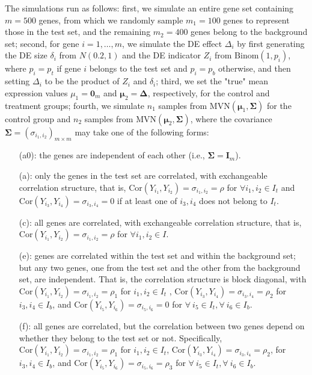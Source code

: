 \documentclass[11pt, a4paper]{article}
\begin{document}
		The simulations run as follows: first, we simulate an entire gene set containing $m=500$ genes, from which we randomly sample $m_1 = 100$ genes to represent those in the test set, and the remaining $m_2=400$ genes belong to the background set; second, for gene $i=1, \ldots, m$, we simulate the DE effect $\Delta_i$ by first generating the DE size $\delta_i$ from $N(0.2, 1)$ and the DE indicator $Z_i$ from $\text{Binom}(1, p_i)$,  where $p_i= p_t$ if gene $i$ belongs to the test set and $p_i = p_b$  otherwise, and then setting $\Delta_i$ to be the product of $Z_i$ and $\delta_i$; third, we set the "true" mean expression values $\mu_1 = \bm 0_m$ and $\bm \mu_2 = \bm \Delta$, respectively,  for the control and treatment groups; fourth, we simulate $n_1$ samples from $\text{MVN}(\bm \mu_1, \bm \Sigma)$ for the control group and $n_2$ samples from $\text{MVN}(\bm \mu_2, \bm \Sigma)$, where the covariance $\bm \Sigma = (\sigma_{i_1, i_2})_{m\times m} $ may take one of the following forms: 
		\begin{enumerate}
			\item[(a0):] the genes are independent of each other (i.e., $\bm \Sigma = \bm I_m$).
			\item[(a):] only the genes in the test set are correlated, with exchangeable correlation structure, that is, $\text{Cor}(Y_{i_1}, Y_{i_2})=\sigma_{i_1, i_2}=\rho$ for $\forall i_1, i_2 \in I_t$ and  $\text{Cor}(Y_{i_3}, Y_{i_4})=\sigma_{i_3, i_4}=0$ if at least one of $i_3, i_4$ does not belong to $I_t$.
			\item[(c):] all genes are correlated, with exchangeable correlation structure, that is, $\text{Cor}(Y_{i_1}, Y_{i_2})=\sigma_{i_1, i_2}=\rho$ for $\forall i_1, i_2 \in I$.
			\item[(e):] genes are correlated within the test set and within the background set; but any two genes, one from the test set and the other from the background set, are independent. That is, the correlation structure is block diagonal, with $\text{Cor}(Y_{i_1}, Y_{i_2})= \sigma_{i_1, i_2}= \rho_1$ for $i_1, i_2 \in I_t$  , $\text{Cor}(Y_{i_3}, Y_{i_4}) = \sigma_{i_3, i_4}=\rho_2$ for $i_3, i_4\in I_b$, and  $\text{Cor}(Y_{i_5}, Y_{i_6})=\sigma_{i_5, i_6}= 0$ for $\forall ~i_5\in I_t, \forall~ i_6\in I_b$.
			\item[(f):] all genes are correlated, but the correlation between two genes depend on whether they belong to the test set or not. Specifically, $\text{Cor}(Y_{i_1}, Y_{i_2})=\sigma_{i_1, i_2}=\rho_1$  for $i_1, i_2 \in I_t$,    $\text{Cor}(Y_{i_3}, Y_{i_4})=\sigma_{i_3, i_4} =\rho_2$, for $ i_3, i_4\in I_b$, and  $\text{Cor}(Y_{i_5}, Y_{i_6})= \sigma_{i_5, i_6}= \rho_3$ for $\forall~ i_5\in I_t, \forall~ i_6\in I_b$.
		\end{enumerate}
		
\end{document}
